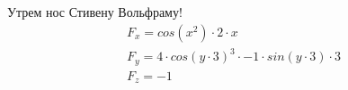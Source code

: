 \documentclass{article}
\begin{document}
\par Утрем нос Стивену Вольфраму!
\begin{gather*}
F_{x} = cos\left(x ^ {2}\right) \cdot 2 \cdot x\\
F_{y} = 4 \cdot cos\left(y \cdot 3\right) ^ {3} \cdot -1 \cdot sin\left(y \cdot 3\right) \cdot 3\\
F_{z} = -1\\
\end{gather*}
\end{document}
